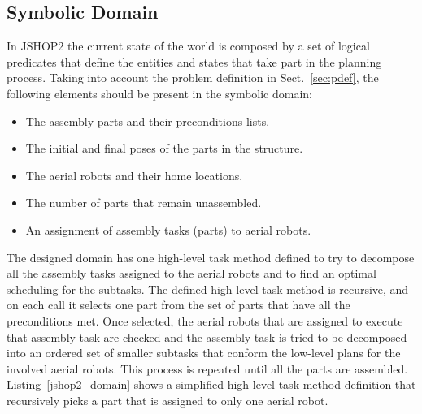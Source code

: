 \documentclass[letterpaper, 10 pt, conference]{ieeeconf}  %
\begin{document}
\subsection{Symbolic Domain}
\label{sec:jshop2_domain}

In JSHOP2 the current state of the world is composed by a set of logical predicates that define the entities and states that take part in the planning process. Taking into account the problem definition in Sect.~\ref{sec:pdef}, the following elements should be present in the symbolic domain:

    \begin{itemize}
    	\item The assembly parts and their preconditions lists.
        \item The initial and final poses of the parts in the structure.
        \item The aerial robots and their home locations.
        \item The number of parts that remain unassembled.
        \item An assignment of assembly tasks (parts) to aerial robots.
	\end{itemize}

The designed domain has one high-level task method defined to try to decompose all the assembly tasks assigned to the aerial robots and to find an optimal scheduling for the subtasks. The defined high-level task method is recursive, and on each call it selects one part from the set of parts that have all the preconditions met. Once selected, the aerial robots that are assigned to execute that assembly task are checked and the assembly task is tried to be decomposed into an ordered set of smaller subtasks that conform the low-level plans for the involved aerial robots. This process is repeated until all the parts are assembled. Listing~\ref{jshop2_domain} shows a simplified high-level task method definition that recursively picks a part that is assigned to only one aerial robot.


\end{document}
